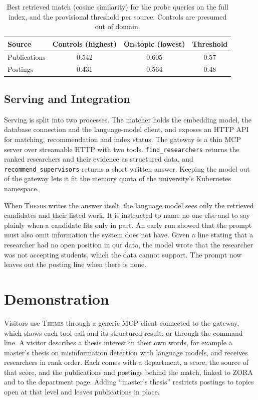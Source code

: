 \documentclass[sigconf,nonacm]{acmart}
\newcommand{\sys}{\textsc{Themis}}
\begin{document}
\begin{table}[t]
\caption{Best retrieved match (cosine similarity) for the probe queries on the full index, and the provisional threshold per source. Controls are presumed out of domain.}
\label{tab:bands}
\small
\begin{tabular}{lccc}
\toprule
Source & Controls (highest) & On-topic (lowest) & Threshold \\
\midrule
Publications & 0.542 & 0.605 & 0.57 \\
Postings     & 0.431 & 0.564 & 0.48 \\
\bottomrule
\end{tabular}
\end{table}

\subsection{Serving and Integration}

Serving is split into two processes. The matcher holds the embedding model, the database connection and the language-model client, and exposes an HTTP API for matching, recommendation and index status. The gateway is a thin MCP server over streamable HTTP with two tools. \texttt{find\_researchers} returns the ranked researchers and their evidence as structured data, and \texttt{recommend\_supervisors} returns a short written answer. Keeping the model out of the gateway lets it fit the memory quota of the university's Kubernetes namespace.

When \sys{} writes the answer itself, the language model sees only the retrieved candidates and their listed work. It is instructed to name no one else and to say plainly when a candidate fits only in part. An early run showed that the prompt must also omit information the system does not have. Given a line stating that a researcher had no open position in our data, the model wrote that the researcher was not accepting students, which the data cannot support. The prompt now leaves out the posting line when there is none.

\section{Demonstration}\label{sec:demo}

Visitors use \sys{} through a generic MCP client connected to the gateway, which shows each tool call and its structured result, or through the command line. A visitor describes a thesis interest in their own words, for example a master's thesis on misinformation detection with language models, and receives researchers in rank order. Each comes with a department, a score, the source of that score, and the publications and postings behind the match, linked to ZORA and to the department page. Adding ``master's thesis'' restricts postings to topics open at that level and leaves publications in place.
\end{document}
